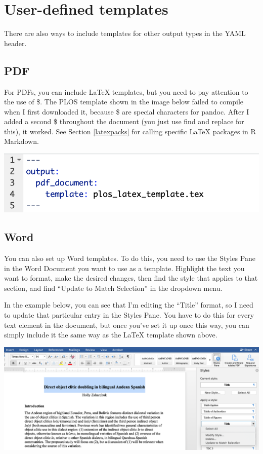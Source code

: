 \documentclass[
]{book}
\begin{document}
\hypertarget{usedef}{%
\section{User-defined templates}\label{usedef}}

There are also ways to include templates for other output types in the YAML header.

\hypertarget{pdf}{%
\subsection{PDF}\label{pdf}}

For PDFs, you can include LaTeX templates, but you need to pay attention to the use of \$. The PLOS template shown in the image below failed to compile when I first downloaded it, because \$ are special characters for pandoc. After I added a second \$ throughout the document (you just use find and replace for this), it worked. See Section \ref{latexpacks} for calling specific LaTeX packages in R Markdown.

\includegraphics[width=10.61in]{images/template_latex}

\hypertarget{word}{%
\subsection{Word}\label{word}}

You can also set up Word templates. To do this, you need to use the Styles Pane in the Word Document you want to use as a template. Highlight the text you want to format, make the desired changes, then find the style that applies to that section, and find ``Update to Match Selection'' in the dropdown menu.

In the example below, you can see that I'm editing the ``Title'' format, so I need to update that particular entry in the Styles Pane. You have to do this for every text element in the document, but once you've set it up once this way, you can simply include it the same way as the LaTeX template shown above.

\includegraphics[width=33.28in]{images/template_word}
\end{document}
